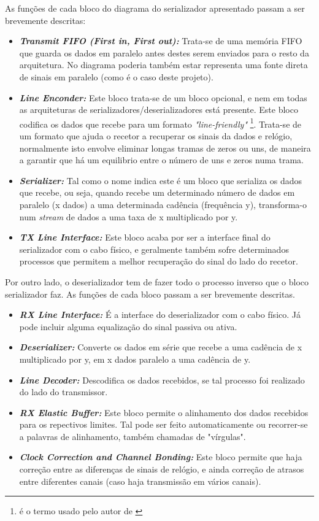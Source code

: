As funções de cada bloco do diagrama do serializador apresentado passam a ser brevemente descritas:

\begin{itemize}
	\item \textbf{\textit{Transmit FIFO (First in, First out):}} Trata-se de uma memória FIFO que guarda os dados em paralelo antes destes serem enviados para o resto da arquitetura. No diagrama poderia também estar representa uma fonte direta de sinais em paralelo (como é o caso deste projeto).
	\item\textbf{\textit{Line Enconder:}} Este bloco trata-se de um  bloco opcional, e nem em todas as arquiteturas de serializadores/deserializadores está presente. Este bloco codifica os dados que recebe para um formato \textit{"line-friendly"} \footnote{é o termo usado pelo autor de \cite{R032}}. Trata-se de um formato que ajuda o recetor a recuperar os sinais da dados e relógio, normalmente isto envolve eliminar longas tramas de zeros ou uns, de maneira a garantir que há um equilibrio entre o número de uns e zeros numa trama.
	\item \textbf{\textit{Serializer:}} Tal como o nome indica este é um bloco que serializa os dados que recebe, ou seja, quando recebe um determinado número de dados em paralelo (x dados) a uma determinada cadência (frequência y), transforma-o num \textit{stream} de dados a uma taxa de x multiplicado por y. 
	\item \textbf{\textit{TX Line Interface:}} Este bloco acaba por ser a interface final do serializador com o cabo físico, e geralmente também sofre determinados processos que permitem a melhor recuperação do sinal do lado do recetor.
\end{itemize}

Por outro lado, o deserializador tem de fazer todo o processo inverso que o bloco serializador faz. As funções de cada bloco passam a ser brevemente descritas.

\begin{itemize}
	\item \textbf{\textit{RX Line Interface:}} É a interface do deserializador com o cabo físico. Já pode incluir alguma equalização do sinal passiva ou ativa.
	\item\textbf{\textit{Deserializer:}} Converte os dados em série que recebe a uma cadência de x multiplicado por y, em x dados paralelo a uma cadência de y.
	\item \textbf{\textit{Line Decoder:}} Descodifica os dados recebidos, se tal processo foi realizado do lado do transmissor.
	\item \textbf{\textit{RX Elastic Buffer:}} Este bloco permite o alinhamento dos dados recebidos para os repectivos limites. Tal pode ser feito automaticamente ou recorrer-se a palavras de alinhamento, também chamadas de "vírgulas".
	\item \textbf{\textit{Clock Correction and Channel Bonding:}} Este bloco permite que haja correção entre as diferenças de sinais de relógio, e ainda correção de atrasos entre diferentes canais (caso haja transmissão em vários canais). 
\end{itemize}

